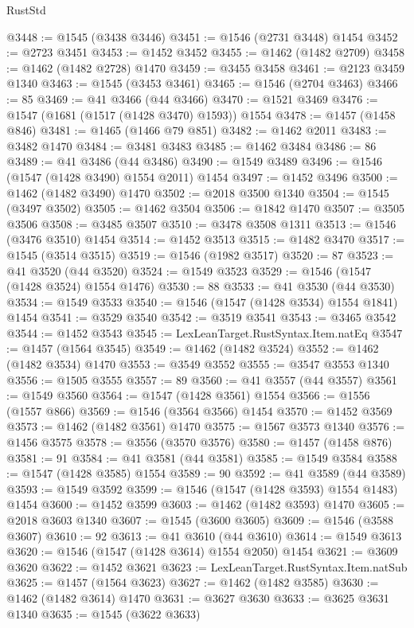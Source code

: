 \begin{lexlean}{RustStd}
\begin{coremodule}
@3448 := @1545 (@3438 @3446)
@3451 := @1546 (@2731 @3448) @1454
@3452 := @2723 @3451
@3453 := @1452 @3452
@3455 := @1462 (@1482 @2709)
@3458 := @1462 (@1482 @2728) @1470
@3459 := @3455 @3458
@3461 := @2123 @3459 @1340
@3463 := @1545 (@3453 @3461)
@3465 := @1546 (@2704 @3463)
@3466 := 85
@3469 := @41 @3466 (@44 @3466)
@3470 := @1521 @3469
@3476 := @1547 (@1681 (@1517 (@1428 @3470) @1593)) @1554
@3478 := @1457 (@1458 @846)
@3481 := @1465 (@1466 @79 @851)
@3482 := @1462 @2011
@3483 := @3482 @1470
@3484 := @3481 @3483
@3485 := @1462 @3484
@3486 := 86
@3489 := @41 @3486 (@44 @3486)
@3490 := @1549 @3489
@3496 := @1546 (@1547 (@1428 @3490) @1554 @2011) @1454
@3497 := @1452 @3496
@3500 := @1462 (@1482 @3490) @1470
@3502 := @2018 @3500 @1340
@3504 := @1545 (@3497 @3502)
@3505 := @1462 @3504
@3506 := @1842 @1470
@3507 := @3505 @3506
@3508 := @3485 @3507
@3510 := @3478 @3508 @1311
@3513 := @1546 (@3476 @3510) @1454
@3514 := @1452 @3513
@3515 := @1482 @3470
@3517 := @1545 (@3514 @3515)
@3519 := @1546 (@1982 @3517)
@3520 := 87
@3523 := @41 @3520 (@44 @3520)
@3524 := @1549 @3523
@3529 := @1546 (@1547 (@1428 @3524) @1554 @1476)
@3530 := 88
@3533 := @41 @3530 (@44 @3530)
@3534 := @1549 @3533
@3540 := @1546 (@1547 (@1428 @3534) @1554 @1841) @1454
@3541 := @3529 @3540
@3542 := @3519 @3541
@3543 := @3465 @3542
@3544 := @1452 @3543
@3545 := LexLeanTarget.RustSyntax.Item.natEq
@3547 := @1457 (@1564 @3545)
@3549 := @1462 (@1482 @3524)
@3552 := @1462 (@1482 @3534) @1470
@3553 := @3549 @3552
@3555 := @3547 @3553 @1340
@3556 := @1505 @3555
@3557 := 89
@3560 := @41 @3557 (@44 @3557)
@3561 := @1549 @3560
@3564 := @1547 (@1428 @3561) @1554
@3566 := @1556 (@1557 @866)
@3569 := @1546 (@3564 @3566) @1454
@3570 := @1452 @3569
@3573 := @1462 (@1482 @3561) @1470
@3575 := @1567 @3573 @1340
@3576 := @1456 @3575
@3578 := @3556 (@3570 @3576)
@3580 := @1457 (@1458 @876)
@3581 := 91
@3584 := @41 @3581 (@44 @3581)
@3585 := @1549 @3584
@3588 := @1547 (@1428 @3585) @1554
@3589 := 90
@3592 := @41 @3589 (@44 @3589)
@3593 := @1549 @3592
@3599 := @1546 (@1547 (@1428 @3593) @1554 @1483) @1454
@3600 := @1452 @3599
@3603 := @1462 (@1482 @3593) @1470
@3605 := @2018 @3603 @1340
@3607 := @1545 (@3600 @3605)
@3609 := @1546 (@3588 @3607)
@3610 := 92
@3613 := @41 @3610 (@44 @3610)
@3614 := @1549 @3613
@3620 := @1546 (@1547 (@1428 @3614) @1554 @2050) @1454
@3621 := @3609 @3620
@3622 := @1452 @3621
@3623 := LexLeanTarget.RustSyntax.Item.natSub
@3625 := @1457 (@1564 @3623)
@3627 := @1462 (@1482 @3585)
@3630 := @1462 (@1482 @3614) @1470
@3631 := @3627 @3630
@3633 := @3625 @3631 @1340
@3635 := @1545 (@3622 @3633)

\end{coremodule}
\end{lexlean}
